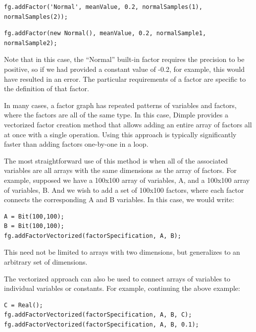 \begin{lstlisting}
fg.addFactor('Normal', meanValue, 0.2, normalSamples(1), normalSamples(2));
\end{lstlisting}

\fi

\ifjava
\begin{lstlisting}
fg.addFactor(new Normal(), meanValue, 0.2, normalSample1, normalSample2);
\end{lstlisting}

\fi

Note that in this case, the ``Normal'' built-in factor requires the precision to be positive, so if we had provided a constant value of -0.2, for example, this would have resulted in an error.  The particular requirements of a factor are specific to the definition of that factor.

\ifmatlab

\label{sec:vectorizedFactorCreation}

In many cases, a factor graph has repeated patterns of variables and factors, where the factors are all of the same type.  In this case, Dimple provides a vectorized factor creation method that allows adding an entire array of factors all at once with a single operation.  Using this approach is typically significantly faster than adding factors one-by-one in a loop.

The most straightforward use of this method is when all of the associated variables are all arrays with the same dimensions as the array of factors.  For example, supposed we have a 100x100 array of variables, A, and a 100x100 array of variables, B.  And we wish to add a set of 100x100 factors, where each factor connects the corresponding A and B variables.  In this case, we would write:

\begin{lstlisting}
A = Bit(100,100);
B = Bit(100,100);
fg.addFactorVectorized(factorSpecification, A, B);
\end{lstlisting}

This need not be limited to arrays with two dimensions, but generalizes to an arbitrary set of dimensions.

The vectorized approach can also be used to connect arrays of variables to individual variables or constants.  For example, continuing the above example:

\begin{lstlisting}
C = Real();
fg.addFactorVectorized(factorSpecification, A, B, C);
fg.addFactorVectorized(factorSpecification, A, B, 0.1);
\end{lstlisting}


